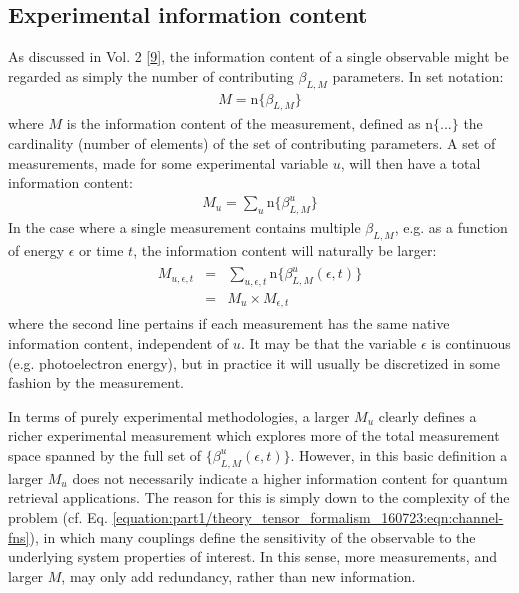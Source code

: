 \documentclass[letterpaper,table,10pt,english]{jupyterBook}
\begin{document}
\subsection{Experimental information content}
\label{\detokenize{part1/theory_info_content_200723:experimental-information-content}}\label{\detokenize{part1/theory_info_content_200723:sec-expt-info-content}}
\sphinxAtStartPar
As discussed in  Vol. 2 {[}\hyperlink{cite.backmatter/bibliography:id678}{9}{]}, the information content of a single observable might be regarded as simply the number of contributing \(\beta_{L,M}\) parameters. In set notation:
\begin{equation}\label{equation:part1/theory_info_content_200723:eq:BLM-set}
\begin{split}M=\mathrm{n}\{\beta_{L,M}\}\end{split}
\end{equation}
\sphinxAtStartPar
where \(M\) is the information content of the measurement, defined as
\(\mathrm{n}\{...\}\) the cardinality (number of elements) of the set of
contributing parameters. A set of measurements, made for some
experimental variable \(u\), will then have a total information content:
\begin{equation*}
\begin{split}M_{u}=\sum_{u}\mathrm{n}\{\beta_{L,M}^{u}\}\end{split}
\end{equation*}
\sphinxAtStartPar
In the case where a single measurement contains multiple \(\beta_{L,M}\),
e.g. as a function of energy \(\epsilon\) or time \(t\), the information
content will naturally be larger:
\begin{equation*}
\begin{split}\begin{aligned}
M_{u,\epsilon,t} & = & \sum_{u,\epsilon,t}\mathrm{n}\{\beta_{L,M}^{u}(\epsilon,t)\}\\
 & = & M_{u}\times M_{\epsilon,t}\end{aligned}\end{split}
\end{equation*}
\sphinxAtStartPar
where the second line pertains if each measurement has the same native
information content, independent of \(u\). It may be that the variable \(\epsilon\)
is continuous (e.g. photoelectron energy), but in practice it will
usually be discretized in some fashion by the measurement.

\sphinxAtStartPar
In terms of purely experimental methodologies, a larger \(M_{u}\) clearly
defines a richer experimental measurement which explores more of the
total measurement space spanned by the full set of
\(\{\beta_{L,M}^{u}(\epsilon,t)\}\). However, in this basic definition a larger
\(M_{u}\) does not necessarily indicate a higher information content for
quantum retrieval applications. The reason for this is simply down to
the complexity of the problem (cf. Eq. \eqref{equation:part1/theory_tensor_formalism_160723:eqn:channel-fns}), in which many couplings define the sensitivity of the observable to the underlying system properties of
interest. In this sense, more measurements, and larger \(M\), may only add
redundancy, rather than new information.
\end{document}
